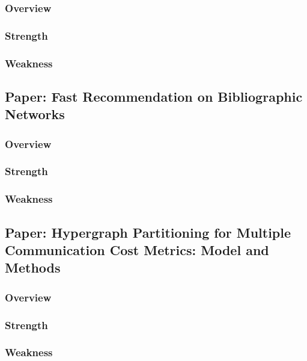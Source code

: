 \documentclass[conference, onecolumn]{IEEEtran}
\begin{document}
\subsubsection{Overview}

\subsubsection{Strength}

\subsubsection{Weakness}


\newpage

\subsection{Paper: Fast Recommendation on Bibliographic Networks}

\subsubsection{Overview}

\subsubsection{Strength}

\subsubsection{Weakness}


\newpage

\subsection{Paper: Hypergraph Partitioning for Multiple Communication Cost Metrics: Model and Methods}

\subsubsection{Overview}

\subsubsection{Strength}

\subsubsection{Weakness}
\end{document}
